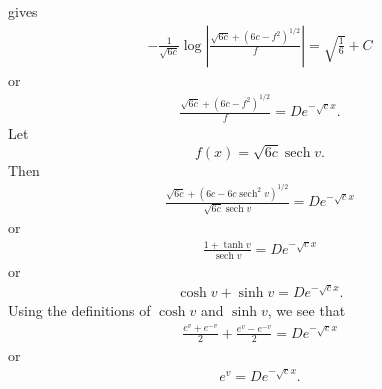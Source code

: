 \documentclass[12pt,reqno]{amsart}
\numberwithin{equation}{section}  %
\DeclareMathOperator{\sech}{sech}
\begin{document}
       gives
       \begin{equation*}
       \begin{split}
         -\frac{1}{\sqrt{6c}} \log | \frac{\sqrt{6c} + (6c - f^{2})^{1/2}}{f} |
         = \sqrt{\frac{1}{6}} + C
       \end{split}
       \end{equation*}
       or
       \begin{equation*}
       \begin{split}
         \frac{\sqrt{6c} + (6c - f^{2})^{1/2}}{f} = D e^{- \sqrt{c} x}.
       \end{split}
       \end{equation*}
       Let 
       \begin{equation}
         \label{sub}
         f(x) = \sqrt{6c} \sech v.
       \end{equation}
       Then 
       \begin{equation*}
       \begin{split}
         \frac{\sqrt{6c} + (6c - 6c \sech^{2}v)^{1/2}}{\sqrt{6c} \sech v} =
         D e^{- \sqrt{c} x}
       \end{split}
       \end{equation*}
       or 
       \begin{equation*}
       \begin{split}
         \frac{1 + \tanh v}{\sech v} = De^{-\sqrt{c} x}
       \end{split}
       \end{equation*}
       or
       \begin{equation*}
       \begin{split}
         \cosh v + \sinh v = De^{-\sqrt{c} x}.
       \end{split}
       \end{equation*}
       Using the definitions of $\cosh v$ and $\sinh v$, we see that
       \begin{equation*}
       \begin{split}
         \frac{e^{v} + e^{-v}}{2} + \frac{e^{v} - e^{-v}}{2}  = De^{-\sqrt{c} x}
       \end{split}
       \end{equation*}
       or
       \begin{equation*}
       \begin{split}
         e^{v} = De^{-\sqrt{c} x}. 
       \end{split}
       \end{equation*}
\end{document}
